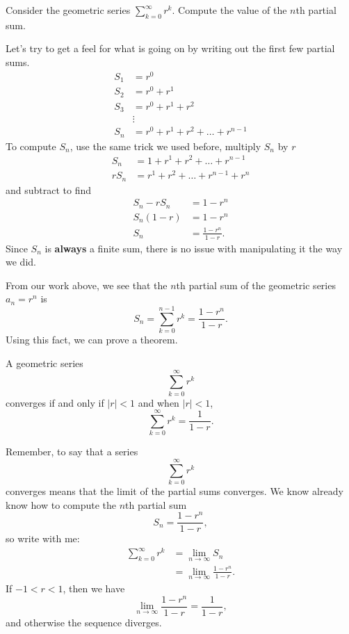 \documentclass{ximera}
\begin{document}
\begin{example}
  Consider the geometric series $\sum_{k=0}^\infty r^k$. Compute the
  value of the $n$th partial sum.
  \begin{explanation}
    Let's try to get a feel for what is going on by writing out the first few partial sums.
    \begin{align*}
      S_1 &= r^0 \\
      S_2 &= r^0 + r^1\\
      S_3 &= r^0 + r^1 + r^2\\
      &\vdots\\
      S_n &= r^0 + r^1 + r^2 + \dots + r^{n-1}
    \end{align*}
    To compute $S_n$, use the same trick we used before, multiply $S_n$ by $r$
    \begin{align*}
      S_n   &= 1 + r^1 + r^2 + \dots + r^{n-1}\\
      r S_n &= r^1 + r^2 + \dots + r^{n-1} + r^n
    \end{align*}
    and subtract to find
    \begin{align*}
      S_n - r S_n &= 1 - r^n\\
      S_n(1-r)    &= 1 - r^n\\
      S_n &= \frac{1 - r^n}{1-r}.
    \end{align*}
    Since $S_n$ is \textbf{always} a finite sum, there is no issue
    with manipulating it the way we did.
  \end{explanation}
\end{example}

From our work above, we see that the $n$th partial sum of the
geometric series $a_n = r^n$ is
\[
S_n = \sum_{k=0}^{n-1} r^k= \frac{1 - r^n}{1-r}.
\]
Using this fact, we can prove a theorem.
\begin{theorem}
  A geometric series
  \[
  \sum_{k= 0}^\infty r^k
  \]
  converges if and only if $|r| < 1$ and when $|r|<1$, 
  \[
  \sum_{k=0}^\infty r^k = \frac{1}{1-r}.
  \]
  \begin{explanation}
    Remember, to say that a series
    \[
    \sum_{k= 0}^\infty r^k
    \]
    converges means that the limit of the partial sums converges. We
    know already know how to compute the $n$th partial sum
    \[
    S_n = \frac{1 - r^n}{1-r},
    \]
    so write with me:
    \begin{align*}
      \sum_{k= 0}^\infty r^k &= \lim_{n\to\infty}S_n \\
      &= \lim_{n\to\infty}\frac{1 - r^n}{1-r}.
    \end{align*}
    If $-1<r<1$, then we have
    \[
    \lim_{n\to\infty}\frac{1 - r^n}{1-r} = \frac{1}{1-r},
    \]
    and otherwise the sequence diverges.
  \end{explanation}
\end{theorem}
\end{document}
